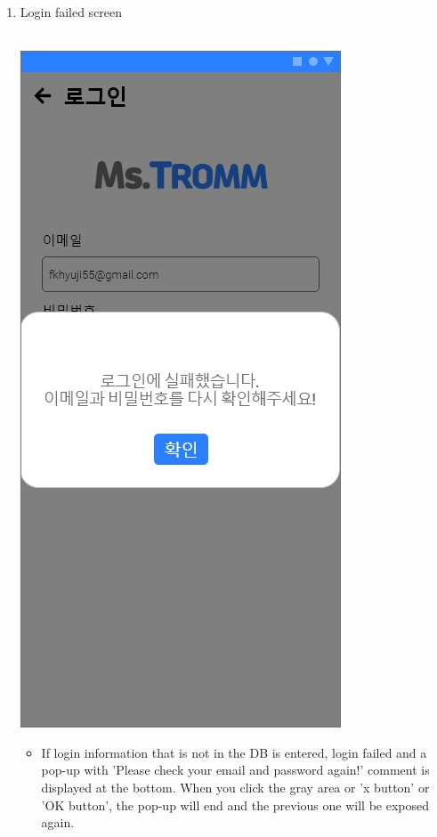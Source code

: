 \documentclass[conference]{IEEEtran}
\begin{document}
\begin{enumerate}
\begin{itemize}
    \end{itemize}
    \item Login failed screen \\\\
    \centerline{\includegraphics[scale=0.32]{로그인2.jpg}}
    \begin{itemize}
    \item[] If login information that is not in the DB is entered, login failed and a pop-up with 'Please check your email and password again!' comment is displayed at the bottom. When you click the gray area or 'x button' or 'OK button', the pop-up will end and the previous one will be exposed again. \\ \\
    \end{itemize}

\end{enumerate}
\end{document}
